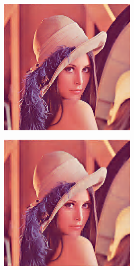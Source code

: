 \begin{figure}
  \centering
  \begin{subfigure}[b]{0.24\textwidth}
    \centering
    \includegraphics[width=\textwidth]{plaatjes/Lenna_db2_0_1.png}
  \end{subfigure}
  \begin{subfigure}[b]{0.24\textwidth}
    \centering
    \includegraphics[width=\textwidth]{plaatjes/Lenna_db2_0_05.png}

\end{subfigure}
\end{figure}
